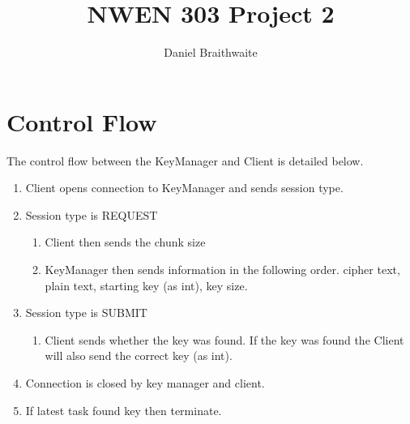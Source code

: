\documentclass[a4paper, 12pt]{article}
\title{NWEN 303 Project 2}
\author{Daniel Braithwaite}
\begin{document}
	\maketitle
	\newpage
  	
  	\section{Control Flow}
		The control flow between the KeyManager and Client is detailed below.  	
  	
  		\begin{enumerate}
  			\item Client opens connection to KeyManager and sends session type.
  			\item Session type is REQUEST
  				\begin{enumerate}
  					\item Client then sends the chunk size
  					\item KeyManager then sends information in the following order. cipher text, plain text, starting key (as int), key size.
  				\end{enumerate}
  			
			\item Session type is SUBMIT
  				\begin{enumerate}
  					\item Client sends whether the key was found. If the key was found the Client will also send the correct key (as int).
  				\end{enumerate}  			
  			\item Connection is closed by key manager and client.
  			\item If latest task found key then terminate.
  		\end{enumerate}
  		
\end{document}
